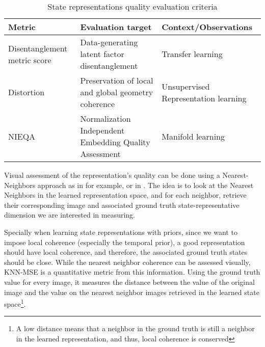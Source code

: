 \documentclass[a4paper]{article}
\begin{document}
\begin{table}[!htbp] 
\caption{State representations quality evaluation criteria}
\label{tab:metrics}
\begin{center}
\begin{small}
\begin{tabular}{p{45mm}|p{45mm}|p{45mm}}
\textbf{Metric} &
\textbf{ Evaluation target} &
\textbf{Context/Observations}\\\hline\hline

Disentanglement metric score \cite{Higgins16} &
Data-generating latent factor disentanglement  &
Transfer learning    \\\hline


Distortion \cite{Indyk01} &
Preservation of local and global geometry coherence  & 
Unsupervised Representation learning    \\\hline


NIEQA \cite{Zhang12} & 
Normalization Independent Embedding Quality Assessment &
Manifold learning \\\hline 

\end{tabular}
\end{small}
\end{center}
\end{table}

Visual assessment of the representation's quality can be done using a Nearest-Neighbors approach as in \cite{Sermanet17} for example, or in \cite{Pinto16}.   The idea is to look at the Nearest Neighbors in the learned representation space, and for each neighbor, retrieve their corresponding image and associated ground truth state-representative dimension we are interested in measuring. 

Specially when learning state representations with priors, since we want to impose local coherence (especially the temporal prior), a good representation should have local coherence, and therefore, the associated ground truth states should be close. While the nearest neighbor coherence can be assessed visually, KNN-MSE is a quantitative metric from this information\cite{Lesort17}. Using the ground truth value for every image, it measures the distance between the value of the original image and the value on the nearest neighbor images retrieved in the learned state space\footnote{A low distance means that a neighbor in the ground truth is still a neighbor in the learned representation, and thus, local coherence is conserved}.
\end{document}

